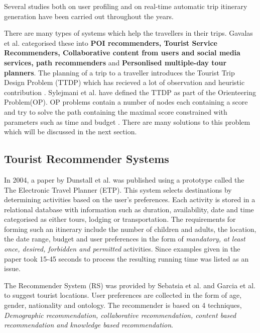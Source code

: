 Several studies both on user profiling and on real-time automatic trip
itinerary generation have been carried out throughout the years. 

There are many types of systems which help the travellers in their
trips. Gavalas et al. \cite{Gavalas2014} categorised these into
\textbf{POI recommenders, Tourist Service Recommenders, Collaborative
content from users and social media services, path recommenders} and
\textbf{Personlised multiple-day tour planners}. The planning of a
trip to a traveller introduces the Tourist Trip Design Problem (TTDP)
which has recieved a lot of observation and heuristic contribution
\cite{Gunawan2016,Delic2018}. Sylejmani et al.\cite{Sylejmani2017} have defined
the TTDP as part of the Orienteering Problem(OP). OP problems contain
a number of nodes each containing a score and try to solve the path
containing the maximal score constrained with parameters such as time
and budget \cite{Gunawan2016}. There are many solutions to this
problem which will be discussed in the next section.

\subsection{Tourist Recommender Systems}

    In 2004, a paper by Dunstall et al. \cite{DUNSTALL2008a} was published
    using a prototype called the The Electronic Travel Planner (ETP). This
    system selects destinations by determining activities based on the
    user’s preferences. Each activity is stored in a relational database
    with information such as duration, availability, date and time
    categorised as either tours, lodging or transportation. The
    requirements for forming such an itinerary include the number of
    children and adults, the location, the date range, budget and user
    preferences in the form of \emph{mandatory, at least once, desired,
    forbidden and permitted} activities. Since examples given in the paper
    took 15-45 seconds to process the resulting running time was listed as
    an issue.

    The Recommender System (RS) was provided by Sebatsia et al.
    \cite{Sebastia2009a} and Garcia et al. \cite{Garcia2011} to suggest
    tourist locations. User preferences are collected in the form of age,
    gender, nationality and ontology. The recommender is based on 4
    techniques, \emph{Demographic recommendation, collaborative
    recommendation, content based recommendation and knowledge based
    recommendation}. 

